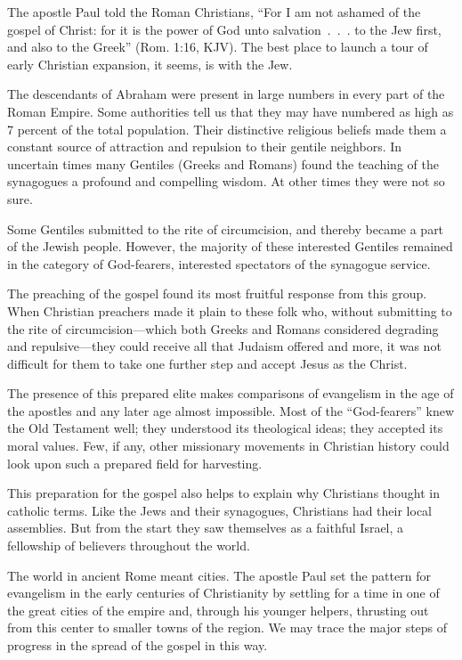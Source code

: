 The apostle Paul told the Roman Christians, “For I am not ashamed of the gospel of Christ: for it is
the power of God unto salvation~.~.~. to the Jew first, and also to the Greek” (Rom. 1:16, KJV). The
best place to launch a tour of early Christian expansion, it seems, is with the Jew.

The descendants of Abraham were present in large numbers in every part of the Roman Empire. Some
authorities tell us that they may have numbered as high as 7 percent of the total population. Their
distinctive religious beliefs made them a constant source of attraction and repulsion to their
gentile neighbors. In uncertain times many Gentiles (Greeks and Romans) found the teaching of the
synagogues a profound and compelling wisdom. At other times they were not so sure.

Some Gentiles submitted to the rite of circumcision, and thereby became a part of the Jewish people.
However, the majority of these interested Gentiles remained in the category of God-fearers,
interested spectators of the synagogue service.

The preaching of the gospel found its most fruitful response from this group. When Christian
preachers made it plain to these folk who, without submitting to the rite of circumcision—which both
Greeks and Romans considered degrading and repulsive—they could receive all that Judaism offered and
more, it was not difficult for them to take one further step and accept Jesus as the Christ.

The presence of this prepared elite makes comparisons of evangelism in the age of the apostles and
any later age almost impossible. Most of the “God-fearers” knew the Old Testament well; they
understood its theological ideas; they accepted its moral values. Few, if any, other missionary
movements in Christian history could look upon such a prepared field for harvesting.

This preparation for the gospel also helps to explain why Christians thought in catholic terms. Like
the Jews and their synagogues, Christians had their local assemblies. But from the start they saw
themselves as a faithful Israel, a fellowship of believers throughout the world.

The world in ancient Rome meant cities. The apostle Paul set the pattern for evangelism in the early
centuries of Christianity by settling for a time in one of the great cities of the empire and,
through his younger helpers, thrusting out from this center to smaller towns of the region. We may
trace the major steps of progress in the spread of the gospel in this way.

